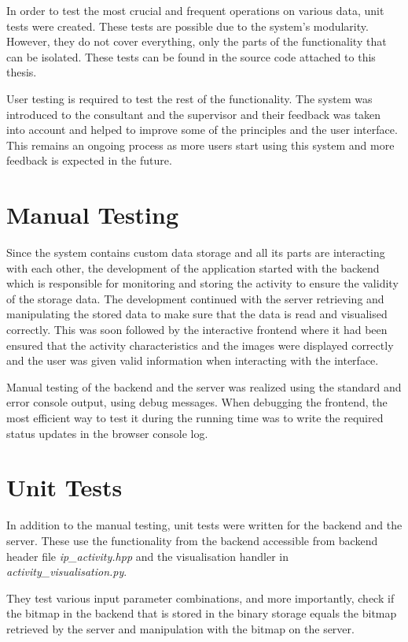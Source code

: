 In order to test the most crucial and frequent operations on various data,
unit tests were created. These tests are possible due to the system's modularity.
However, they do not cover everything, only the parts
of the functionality that can be isolated. These tests can be found in
the source code attached to this thesis.

User testing is required to test the rest of the functionality.
The system was introduced to the consultant and the supervisor and their
feedback was taken into account and helped to improve some of the
principles and the user interface.
This remains an ongoing process as more users start using this system and
more feedback is expected in the future.

\section{Manual Testing}
Since the system contains custom data storage and all its parts are
interacting with each other, the development of the application started
with the backend which is responsible for monitoring and storing the activity
to ensure the validity of the storage data. The development continued
with the server retrieving and manipulating the stored data to make
sure that the data is read and visualised correctly. This was soon followed
by the interactive frontend where it had been ensured that the activity
characteristics and the images were displayed correctly and the user was given
valid information when interacting with the interface.

Manual testing of the backend and the server was
realized using the standard and error console output, using debug messages.
When debugging the frontend, the most efficient way to test it during the
running time was to write the required status updates in the browser console log.

\section{Unit Tests}
In addition to the manual testing, unit tests were written for the backend
and the server. These use the functionality from the backend accessible from
backend header file \textit{ip\_activity.hpp} and the visualisation handler
in \textit{activity\_visualisation.py}.

They test various input parameter combinations, and more importantly, check
if the bitmap in the backend that is stored in the binary storage equals
the bitmap retrieved by the server and manipulation with the bitmap
on the server.

